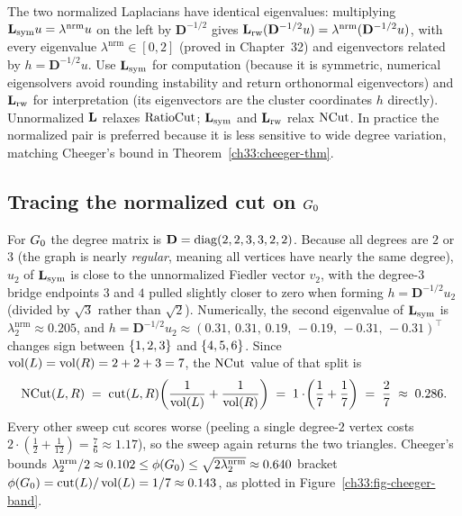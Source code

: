 \begin{formalbox}
The two normalized Laplacians have identical eigenvalues: multiplying $\mathbf{L}_{\mathrm{sym}} u = \lambda^{\mathrm{nrm}} u$ on the left by $\mathbf{D}^{-1/2}$ gives $\mathbf{L}_{\mathrm{rw}}(\mathbf{D}^{-1/2}u) = \lambda^{\mathrm{nrm}}(\mathbf{D}^{-1/2}u)$, with every eigenvalue $\lambda^{\mathrm{nrm}} \in [0,2]$ (proved in Chapter~32) and eigenvectors related by $h = \mathbf{D}^{-1/2}u$. Use $\mathbf{L}_{\mathrm{sym}}$ for computation (because it is symmetric, numerical eigensolvers avoid rounding instability and return orthonormal eigenvectors) and $\mathbf{L}_{\mathrm{rw}}$ for interpretation (its eigenvectors are the cluster coordinates $h$ directly). Unnormalized $\mathbf{L}$ relaxes $\operatorname{RatioCut}$; $\mathbf{L}_{\mathrm{sym}}$ and $\mathbf{L}_{\mathrm{rw}}$ relax $\operatorname{NCut}$. In practice the normalized pair is preferred because it is less sensitive to wide degree variation, matching Cheeger's bound in Theorem~\ref{ch33:cheeger-thm}.
\end{formalbox}

\subsection*{Tracing the normalized cut on $G_0$}

For $G_0$ the degree matrix is $\mathbf{D}=\operatorname{diag}(2,2,3,3,2,2)$. Because all degrees are $2$ or $3$ (the graph is nearly \emph{regular}, meaning all vertices have nearly the same degree), $u_2$ of $\mathbf{L}_{\mathrm{sym}}$ is close to the unnormalized Fiedler vector $v_2$, with the degree-$3$ bridge endpoints $3$ and $4$ pulled slightly closer to zero when forming $h = \mathbf{D}^{-1/2}u_2$ (divided by $\sqrt{3}$ rather than $\sqrt{2}$). Numerically, the second eigenvalue of
$\mathbf{L}_{\mathrm{sym}}$ is $\lambda_2^{\mathrm{nrm}} \approx 0.205$, and $h = \mathbf{D}^{-1/2}u_2 \approx (0.31,\, 0.31,\, 0.19,\, -0.19,\, -0.31,\, -0.31)^\top$ changes sign between $\{1,2,3\}$ and $\{4,5,6\}$. Since $\operatorname{vol}(L)=\operatorname{vol}(R) = 2+2+3 = 7$, the $\operatorname{NCut}$ value of that split is
\[
  \operatorname{NCut}(L,R) \;=\; \operatorname{cut}(L,R)\!\left(\frac{1}{\operatorname{vol}(L)}+\frac{1}{\operatorname{vol}(R)}\right)
  \;=\; 1\cdot\!\left(\frac{1}{7}+\frac{1}{7}\right) \;=\; \frac{2}{7} \;\approx\; 0.286.
\]
Every other sweep cut scores worse (peeling a single degree-$2$ vertex
costs $2\cdot(\tfrac{1}{2} + \tfrac{1}{12}) = \tfrac{7}{6} \approx 1.17$), so the sweep again returns the two triangles. Cheeger's
bounds $\lambda_2^{\mathrm{nrm}}/2 \approx 0.102 \le \phi(G_0) \le \sqrt{2\lambda_2^{\mathrm{nrm}}} \approx 0.640$ bracket $\phi(G_0)=\operatorname{cut}(L)/\operatorname{vol}(L)=1/7\approx 0.143$, as plotted in Figure~\ref{ch33:fig-cheeger-band}.

